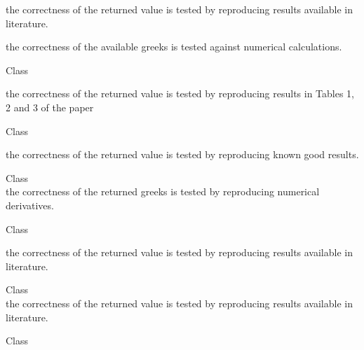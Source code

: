 \begin{DoxyRefList}
\begin{DoxyItemize}
\item the correctness of the returned value is tested by reproducing results available in literature.
\item the correctness of the available greeks is tested against numerical calculations.
\end{DoxyItemize}
\item[Class \doxylink{class_quant_lib_1_1_analytic_discrete_geometric_average_price_asian_heston_engine}{Quant\+Lib\+::Analytic\+Discrete\+Geometric\+Average\+Price\+Asian\+Heston\+Engine} ]\hfill \\
\label{test__test000005}%
%

\begin{DoxyItemize}
\item the correctness of the returned value is tested by reproducing results in Tables 1, 2 and 3 of the paper
\end{DoxyItemize}
\item[Class \doxylink{class_quant_lib_1_1_analytic_discrete_geometric_average_strike_asian_engine}{Quant\+Lib\+::Analytic\+Discrete\+Geometric\+Average\+Strike\+Asian\+Engine} ]\hfill \\
\label{test__test000095}%
%

\begin{DoxyItemize}
\item the correctness of the returned value is tested by reproducing known good results.
\end{DoxyItemize}
\item[Class \doxylink{class_quant_lib_1_1_analytic_dividend_european_engine}{Quant\+Lib\+::Analytic\+Dividend\+European\+Engine} ]\hfill \\
\label{test__test000139}%
%
the correctness of the returned greeks is tested by reproducing numerical derivatives.  
\item[Class \doxylink{class_quant_lib_1_1_analytic_double_barrier_binary_engine}{Quant\+Lib\+::Analytic\+Double\+Barrier\+Binary\+Engine} ]\hfill \\
\label{test__test000103}%
%

\begin{DoxyItemize}
\item the correctness of the returned value is tested by reproducing results available in literature. 
\end{DoxyItemize}
\item[Class \doxylink{class_quant_lib_1_1_analytic_double_barrier_engine}{Quant\+Lib\+::Analytic\+Double\+Barrier\+Engine} ]\hfill \\
\label{test__test000104}%
%
the correctness of the returned value is tested by reproducing results available in literature.  
\item[Class \doxylink{class_quant_lib_1_1_analytic_european_engine}{Quant\+Lib\+::Analytic\+European\+Engine} ]\hfill \\
\label{test__test000140}%
%


\end{DoxyRefList}
